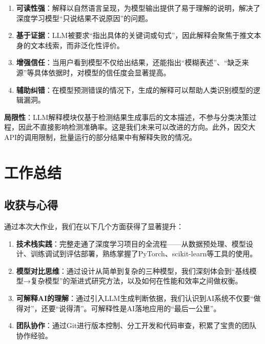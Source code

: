 \documentclass[12pt,a4paper]{article}
\begin{document}
\begin{enumerate}[leftmargin=2em]
    \item \textbf{可读性强}：解释以自然语言呈现，为模型输出提供了易于理解的说明，解决了深度学习模型“只说结果不说原因”的问题。
    
    \item \textbf{基于证据}：LLM被要求“指出具体的关键词或句式”，因此解释会聚焦于推文本身的文本线索，而非泛化性评价。
    
    \item \textbf{增强信任}：当用户看到模型不仅给出结果，还能指出“模糊表述”、“缺乏来源”等具体依据时，对模型的信任度会显著提高。
    
    \item \textbf{辅助纠错}：在模型预测错误的情况下，生成的解释可以帮助人类识别模型的逻辑漏洞。
\end{enumerate}

\textbf{局限性}：LLM解释模块仅基于检测结果生成事后的文本描述，不参与分类决策过程，因此不直接影响检测准确率。这是我们未来可以改进的方向。此外，因交大API的调用限制，批量运行的部分结果中有解释失败的情况。

\section{工作总结}

\subsection{收获与心得}

通过本次大作业，我们在以下几个方面获得了显著提升：

\begin{enumerate}[leftmargin=2em]
    \item \textbf{技术栈实践}：完整走通了深度学习项目的全流程——从数据预处理、模型设计、训练调试到评估部署，熟练掌握了PyTorch、scikit-learn等工具的使用。
    
    \item \textbf{模型对比思维}：通过设计从简单到复杂的三种模型，我们深刻体会到“基线模型→复杂模型”的渐进式研究方法，以及如何在性能和效率之间做权衡。
    
    \item \textbf{可解释AI的理解}：通过引入LLM生成判断依据，我们认识到AI系统不仅要“做得对”，还要“说得清”。可解释性是AI落地应用的“最后一公里”。
    
    \item \textbf{团队协作}：通过Git进行版本控制、分工开发和代码审查，积累了宝贵的团队协作经验。
\end{enumerate}
\end{document}
